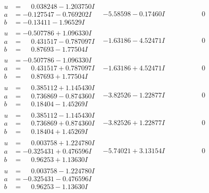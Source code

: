 \documentclass[1p]{elsarticle_modified}
\theoremstyle{definition}
\begin{document}
$$\begin{array}{c|c|c}
\begin{aligned}
u &= \phantom{-}0.038248 - 1.203750 I \\
a &= -0.127547 - 0.769202 I \\
b &= -0.13411 - 1.96529 I\end{aligned}
 & -5.58598 - 0.17460 I & \phantom{-0.000000 } 0 \\ \hline\begin{aligned}
u &= -0.507786 + 1.096330 I \\
a &= \phantom{-}0.431517 - 0.787097 I \\
b &= \phantom{-}0.87693 - 1.77504 I\end{aligned}
 & -1.63186 - 4.52471 I & \phantom{-0.000000 } 0 \\ \hline\begin{aligned}
u &= -0.507786 - 1.096330 I \\
a &= \phantom{-}0.431517 + 0.787097 I \\
b &= \phantom{-}0.87693 + 1.77504 I\end{aligned}
 & -1.63186 + 4.52471 I & \phantom{-0.000000 } 0 \\ \hline\begin{aligned}
u &= \phantom{-}0.385112 + 1.145430 I \\
a &= \phantom{-}0.736869 - 0.874360 I \\
b &= \phantom{-}0.18404 - 1.45269 I\end{aligned}
 & -3.82526 - 1.22877 I & \phantom{-0.000000 } 0 \\ \hline\begin{aligned}
u &= \phantom{-}0.385112 - 1.145430 I \\
a &= \phantom{-}0.736869 + 0.874360 I \\
b &= \phantom{-}0.18404 + 1.45269 I\end{aligned}
 & -3.82526 + 1.22877 I & \phantom{-0.000000 } 0 \\ \hline\begin{aligned}
u &= \phantom{-}0.003758 + 1.224780 I \\
a &= -0.325431 + 0.476596 I \\
b &= \phantom{-}0.96253 + 1.13630 I\end{aligned}
 & -5.74021 + 3.13154 I & \phantom{-0.000000 } 0 \\ \hline\begin{aligned}
u &= \phantom{-}0.003758 - 1.224780 I \\
a &= -0.325431 - 0.476596 I \\
b &= \phantom{-}0.96253 - 1.13630 I\end{aligned}

\end{array}$$
\end{document}
